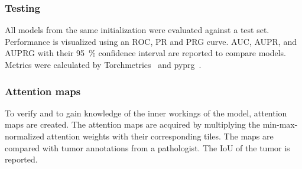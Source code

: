 \subsubsection{Testing}
All models from the same initialization were evaluated against a test set.
Performance is visualized using an ROC, PR and PRG curve.
AUC, AUPR, and AUPRG with their \qty{95}{\percent} confidence interval are reported to compare models.
Metrics were calculated by Torchmetrics~ and pyprg~.

\subsubsection{Attention maps}
To verify and to gain knowledge of the inner workings of the model, attention maps are created.
The attention maps are acquired by multiplying the min-max-normalized attention weights with their corresponding tiles.
The maps are compared with tumor annotations from a pathologist.
The IoU of the tumor is reported.
